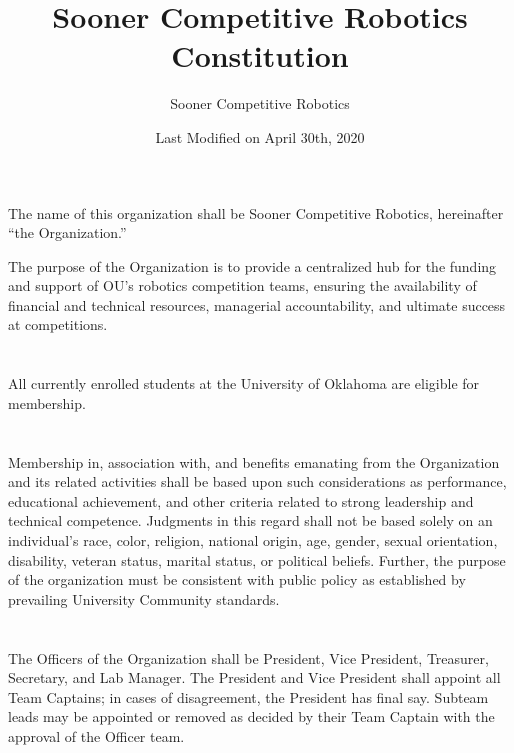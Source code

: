 \documentclass[12pt]{cls/constitution}
\begin{document}
\title{Sooner Competitive Robotics Constitution}
\author{Sooner Competitive Robotics}
\date{Last Modified on April 30th, 2020}
\maketitle
\setcounter{tocdepth}{0}
\tableofcontents
\newpage


The name of this organization shall be Sooner Competitive Robotics, hereinafter “the Organization.”


The purpose of the Organization is to provide a centralized hub for the funding and support of OU's robotics competition teams, ensuring the availability of financial and technical resources, managerial accountability, and ultimate success at competitions. 


\section{}
All currently enrolled students at the University of Oklahoma are eligible for membership. 

\section{}
Membership in, association with, and benefits emanating from the Organization and its related activities shall be based upon such considerations as performance, educational achievement, and other criteria related to strong leadership and technical competence. Judgments in this regard shall not be based solely on an individual’s race, color, religion, national origin, age, gender, sexual orientation, disability, veteran status, marital status, or political beliefs. Further, the purpose of the organization must be consistent with public policy as established by prevailing University Community standards.  


\section{}
The Officers of the Organization shall be President, Vice President, Treasurer, Secretary, and Lab Manager.
The President and Vice President shall appoint all Team Captains; in cases of disagreement, the President has final say.
Subteam leads may be appointed or removed as decided by their Team Captain with the approval of the Officer team.
\end{document}
